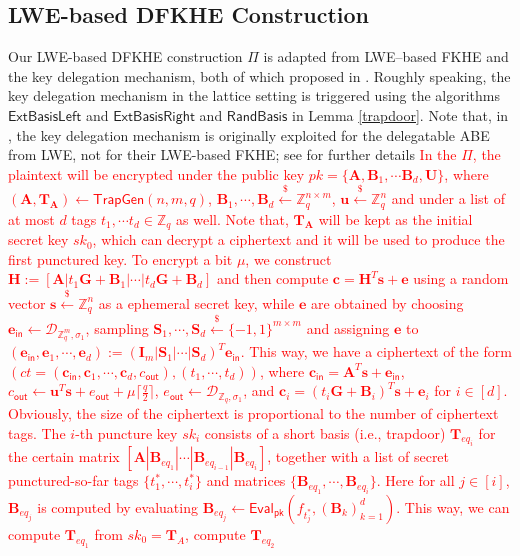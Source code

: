 \documentclass[runningheads,10pt]{llncs}
\begin{document}
\subsection{LWE-based DFKHE Construction} \label{dfkhe}
Our LWE-based DFKHE construction $\Pi$ is adapted from LWE--based FKHE and the key delegation mechanism, 
both of which proposed in \cite{BGG+14}. Roughly speaking,  the key delegation mechanism in the lattice setting is triggered 
using the algorithms $\mathsf{ExtBasisLeft}$ and $\mathsf{ExtBasisRight}$ and $\mathsf{RandBasis}$ in Lemma \ref{trapdoor}.
\iffalse
Note that,  in \cite{BGG+14}, the key delegation mechanism is originally exploited for the delegatable ABE from LWE, not for their LWE-based FKHE;  see \cite[Subsection 5.1]{BGG+14} for further details
\textcolor{red}{
In the $\Pi$, the plaintext will be encrypted under the public key $pk=\{\textbf{A},\textbf{B}_1, \cdots \textbf{B}_d , \textbf{U}\}$, where $(\textbf{A},\textbf{T}_\textbf{A}) \leftarrow \textsf{TrapGen}(n,m,q)$, $\textbf{B}_1, \cdots ,\textbf{B}_d \xleftarrow{\$} \mathbb{Z}_q^{n \times m}$,  $\textbf{u} \xleftarrow{\$}\mathbb{Z}_q^{n} $ and under a list of at most $d$ tags $t_1, \cdots t_d \in \mathbb{Z}_q$ as well. Note that, $\textbf{T}_\textbf{A}$ will be kept as the initial secret key $sk_0$, which can decrypt a ciphertext and it will be used to produce the first punctured key. To encrypt a bit $\mu$, we construct $\textbf{H}:= [\textbf{A}|t_1\textbf{G}+\textbf{B}_1|\cdots |t_d \textbf{G}+\textbf{B}_d]$ and then compute $\textbf{c}=\textbf{H}^T\textbf{s}+\textbf{e}$ using a random vector $\textbf{s} \xleftarrow{\$}\mathbb{Z}_q^{n}$ as a ephemeral secret key, while $\textbf{e}$ are obtained by choosing  $\textbf{e}_\textsf{in} \leftarrow \mathcal{D}_{\mathbb{Z}_q^{m},\sigma_1}$, sampling  $\textbf{S}_1, \cdots, \textbf{S}_{d} \xleftarrow{\$} \{-1,1\}^{m \times m}$ and  assigning  $\textbf{e}$ to $(\textbf{e}_{ \textsf{in}}, \textbf{e}_{1}, \cdots, \textbf{e}_{d}) :=(\textbf{I}_m|\textbf{S}_1|\cdots|\textbf{S}_{d})^T\textbf{e}_\textsf{in}$. This way, we have a ciphertext of the form  $(ct= (\textbf{c}_{\textsf{in}}, \textbf{c}_1, \cdots, \textbf{c}_d, c_{\textsf{out}}), (t_1, \cdots, t_d)) $, where $\textbf{c}_{\textsf{in}}=\textbf{A}^T \textbf{s}+\textbf{e}_{\textsf{in}}$, $c_{\textsf{out}} \leftarrow \textbf{u}^T \textbf{s}+e_{\textsf{out}}+\mu \lceil \frac{q}{2} \rceil$,  $e_{\textsf{out}} \leftarrow \mathcal{D}_{\mathbb{Z}_q,\sigma_1}$, and $\textbf{c}_{i}=(t_i\textbf{G}+\textbf{B}_i)^T \textbf{s}+\textbf{e}_{i}$ for $i\in [d]$. Obviously, the size of the ciphertext is proportional to the number of ciphertext tags. The $i$-th puncture key $sk_i$ consists of a short basis  (i.e., trapdoor)  $\textbf{T}_{eq_{i}}$ for the certain matrix $[\textbf{A}|\textbf{B}_{eq_{1}}|\cdots |\textbf{B}_{eq_{{i-1}}}|\textbf{B}_{eq_{{i}}}]$, together with a list of secret  punctured-so-far tags $\{t^*_1, \cdots, t^*_i\}$  and matrices $\{\textbf{B}_{eq_1}, \cdots, \textbf{B}_{eq_i}\}$. Here  for all $j \in [i]$, $\textbf{B}_{eq_j}$ is computed by evaluating $\textbf{B}_{eq_{j}} \leftarrow \textsf{Eval}_\textsf{pk}(f_{t^*_j}, (\textbf{B}_k)_{k=1}^d)$. This way, we can compute  $\textbf{T}_{eq_{1}}$ from $sk_0=\textbf{T}_{A}$, compute $\textbf{T}_{eq_{2}}$ }
\end{document}
